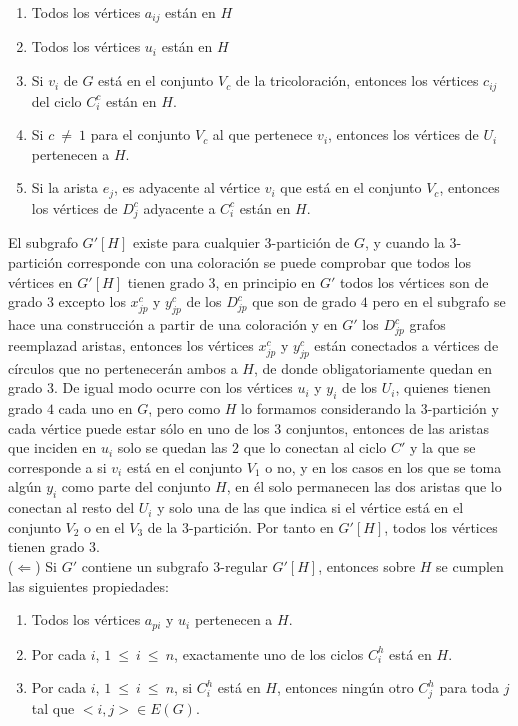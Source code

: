 \documentclass{article}
\begin{document}
\begin{enumerate}
    \item Todos los v\'ertices $a_{ij}$ est\'an en $H$
    \item Todos los v\'ertices $u_{i}$ est\'an en $H$
    \item Si $v_i$ de $G$ est\'a en el conjunto $V_c$ de la tricoloraci\'on, entonces los v\'ertices $c_{ij}$ del ciclo $C_i^c$ est\'an en $H$.
    \item Si $c ~\neq ~1$ para el conjunto $V_c$ al que pertenece $v_i$, entonces los v\'ertices de $U_i$ pertenecen a $H$.
    \item Si la arista $e_j$, es adyacente al v\'ertice $v_i$ que est\'a en el conjunto $V_c$, entonces los v\'ertices de $D_j^c$ adyacente a $C_i^c$ est\'an en $H$.
\end{enumerate}
    El subgrafo $G'[H]$ existe para cualquier $3$-partici\'on de $G$, y cuando la $3$-partici\'on corresponde con una 
    coloraci\'on se puede comprobar que todos los v\'ertices en $G'[H]$ tienen grado $3$, en principio en $G'$ todos los v\'ertices son de grado $3$ excepto los 
    $x_{jp}^c$ y $y_{jp}^c$ de los $D_{jp}^c$ que son de grado $4$ pero en el subgrafo se hace una construcci\'on a partir de una coloraci\'on y en $G'$ los $D_{jp}^c$ grafos reemplazad aristas, 
    entonces los v\'ertices $x_{jp}^c$ y $y_{jp}^c$ est\'an conectados a v\'ertices de c\'irculos que no pertenecer\'an ambos a $H$, de donde obligatoriamente quedan en grado $3$. De igual modo ocurre con los v\'ertices $u_i$ y $y_i$ de los $U_i$, quienes tienen 
    grado $4$ cada uno en $G$, pero como $H$ lo formamos considerando la $3$-partici\'on y cada v\'ertice puede estar s\'olo en uno de los $3$ conjuntos, entonces de las aristas que inciden en $u_i$ solo se quedan las $2$ que lo conectan al ciclo $C'$ y la que se corresponde a si $v_i$ 
    est\'a en el conjunto $V_1$ o no, y en los casos en los que se toma alg\'un $y_i$ como parte del conjunto $H$, en \'el solo permanecen las dos aristas que lo conectan al resto del $U_i$ y solo una de las que indica si el v\'ertice est\'a en el conjunto $V_2$ o en el $V_3$ de la $3$-partici\'on. 
    Por tanto en $G'[H]$, todos los v\'ertices tienen grado $3$.\\ 

($\Leftarrow$) Si $G'$ contiene un subgrafo $3$-regular $G'[H]$, entonces sobre $H$ se cumplen las siguientes propiedades:\\ 

\begin{enumerate}
    \item Todos los v\'ertices $a_{pi}$ y $u_i$ pertenecen a $H$.
    \item Por cada $i$, $1~ \leq~i~\leq ~n$, exactamente uno de los ciclos $C_i^{h}$ est\'a en $H$.
    \item Por cada $i$, $1~ \leq~i~\leq ~n$, si $C_i^{h}$ est\'a en $H$, entonces ning\'un otro $C_j^{h}$ para toda $j$ tal que $<i,j> \in E(G)$.
\end{enumerate}
\end{document}
